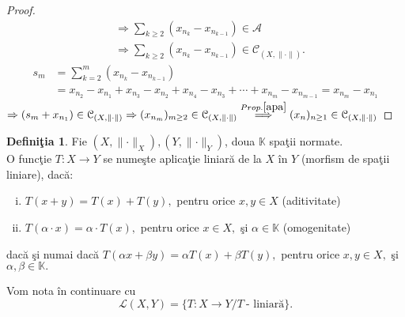 \documentclass[ a4paper, 12pt]{report}
\theoremstyle{definition}
\newtheorem{definition}{\bf Defini\c tia}[section]
\theoremstyle{remark}
\numberwithin{equation}{section}
\begin{document}
\begin{proof}
\begin{align*}
 &\Rightarrow \sum\limits_{k \geq 2} (x_{n_k} - x_{n_{k-1}}) \in \mathcal{A}\\
 &\Rightarrow \sum\limits_{k \geq 2}(x_{n_k} - x_{n_{k-1}}) \in \mathcal{C}_{(X, \lVert \cdot \rVert)}.
 \end{align*}
\begin{align*}
s_m &= \sum\limits_{k=2}^{m}(x_{n_k}-x_{n_{k-1}})\\
&=x_{n_2}-x_{n_1}+x_{n_3}-x_{n_2}+x_{n_4}-x_{n_3}+\cdots+x_{n_m}-x_{n_{m-1}}=x_{n_m}-x_{n_1} 
\end{align*}
$\Rightarrow (s_m + x_{n_1}) \in \mathcal{C}_{(X, \Vert \cdot \rVert)} \Rightarrow (x_{n_m})_{m \geq 2} \in \mathcal{C}_{(X, \lVert \cdot \rVert)} \stackrel{Prop. \ref{apa}}{\Longrightarrow}
 (x_n)_{n \geq 1} \in \mathcal{C}_{(X, \Vert \cdot \rVert)}$

\end{proof}
\begin{definition}
Fie $(X,\lVert \cdot \rVert_{X}), (Y,\lVert \cdot \rVert_{Y})$, doua $\mathbb{K}$ spa\c tii normate.\\
O func\c tie $T : X \rightarrow Y$ se nume\c ste aplica\c tie liniar\u a de la $X$ \^in $Y$ (morfism de spa\c tii liniare), dac\u a:\\
\begin{enumerate}[(i)]
\item $T(x+y) = T(x) + T(y),$ pentru orice $x,y \in X$ (aditivitate)
\item $T(\alpha \cdot x) = \alpha \cdot T(x),$ pentru orice $x \in X,$ \c si $\alpha \in \mathbb{K}$ (omogenitate)
\end{enumerate} dac\u a \c si numai dac\u a $T(\alpha x + \beta y) = \alpha T(x) + \beta T(y),$ pentru orice $x,y \in X,$ \c si $\alpha,\beta \in \mathbb{K}.$
\end{definition}
Vom nota \^in continuare cu 
$$\mathcal{L}(X,Y) = \{ T: X \rightarrow Y / T\ \mbox{- liniar\u a} \}.$$ 
\end{document}
